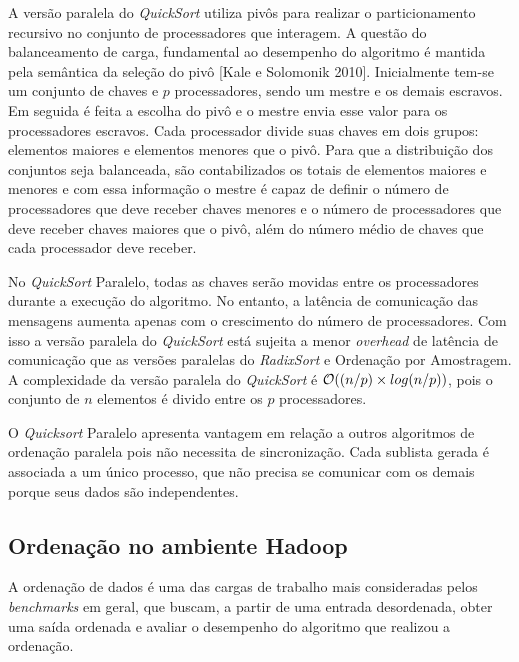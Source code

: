 A versão paralela do \textit{QuickSort} utiliza pivôs para realizar o particionamento recursivo no conjunto de processadores que interagem. A questão do balanceamento de carga, fundamental ao desempenho do algoritmo é mantida pela semântica da seleção do pivô [Kale e Solomonik 2010]. Inicialmente tem-se um conjunto de chaves e $p$ processadores, sendo um mestre e os demais escravos. Em seguida é feita a escolha do pivô e o mestre envia esse valor para os processadores escravos. Cada processador divide suas chaves em dois grupos: elementos maiores e elementos menores que o pivô. 
Para que  a distribuição dos conjuntos seja balanceada, são contabilizados os totais de elementos maiores e menores e com essa informação o mestre é capaz de definir o número de processadores que deve receber chaves menores e o número de processadores que deve receber chaves maiores que o pivô, além do número médio de chaves que cada processador deve receber. 

No \textit{QuickSort} Paralelo, todas as chaves serão movidas entre os processadores durante a execução do algoritmo. No entanto, a latência de comunicação das mensagens aumenta apenas com o crescimento do número de processadores. Com isso a versão paralela do \textit{QuickSort} está sujeita a menor \textit{overhead} de latência de comunicação que as versões paralelas do \textit{RadixSort} e Ordenação por Amostragem. A complexidade da versão paralela do \textit{QuickSort} é ${\cal O}((n/p) \times log(n/p))$, pois o conjunto de $n$ elementos é divido entre os $p$ processadores.  

 
O \textit{Quicksort} Paralelo apresenta vantagem em relação a outros algoritmos de ordenação paralela pois 
não necessita de sincronização. Cada sublista gerada é associada a um único processo, que não precisa se comunicar com os demais porque seus dados são independentes. 


	
 \subsection{Ordenação no ambiente Hadoop}
\label{sec:benchmarks}
A ordenação de dados é uma das cargas de trabalho mais consideradas pelos \textit{benchmarks} em geral, que buscam, a partir de uma entrada desordenada, obter uma saída ordenada e avaliar o desempenho do algoritmo que realizou a ordenação.

